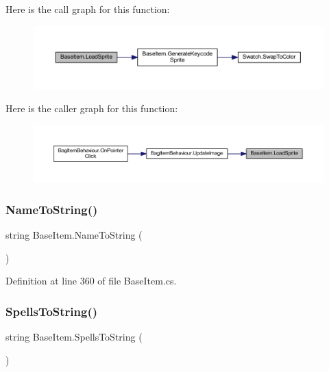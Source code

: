 Here is the call graph for this function\+:
\nopagebreak
\begin{figure}[H]
\begin{center}
\leavevmode
\includegraphics[width=350pt]{class_base_item_abedb8e41aaa0f3ee702ae8fa678204e2_cgraph}
\end{center}
\end{figure}
Here is the caller graph for this function\+:
\nopagebreak
\begin{figure}[H]
\begin{center}
\leavevmode
\includegraphics[width=350pt]{class_base_item_abedb8e41aaa0f3ee702ae8fa678204e2_icgraph}
\end{center}
\end{figure}
\mbox{\label{class_base_item_a837fa537092e144e95b353e3f1ffaeb6}} 
\subsubsection{\texorpdfstring{NameToString()}{NameToString()}}
{\footnotesize\ttfamily string Base\+Item.\+Name\+To\+String (\begin{DoxyParamCaption}{ }\end{DoxyParamCaption})}



Definition at line 360 of file Base\+Item.\+cs.

\mbox{\label{class_base_item_a7b49af5c45c493b9ea7319de44c6c138}} 
\subsubsection{\texorpdfstring{SpellsToString()}{SpellsToString()}}
{\footnotesize\ttfamily string Base\+Item.\+Spells\+To\+String (\begin{DoxyParamCaption}{ }\end{DoxyParamCaption})}



